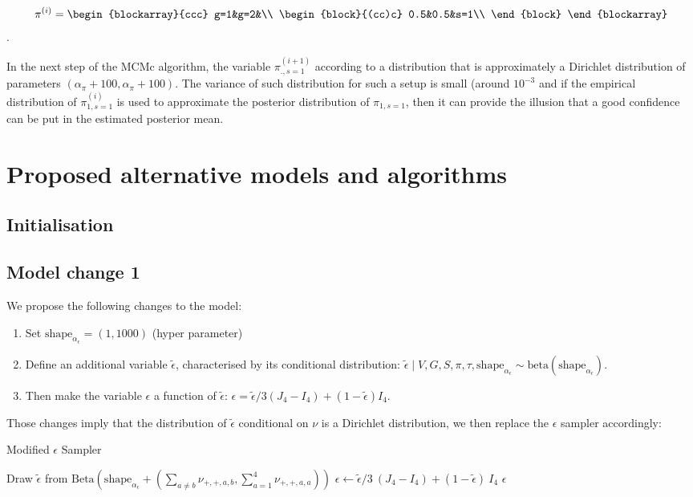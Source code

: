 \documentclass{article}
\begin{document}
$$\pi^{(i)}=\begin{blockarray}{ccc}
    g=1&g=2&\\
    \begin{block}{(cc)c}
    0.5&0.5&s=1\\
    \end{block}
\end{blockarray}$$.
    
In the next step of the MCMc algorithm, the variable $\pi^{(i+1)}_{.,s=1}$ according to a distribution that is approximately a Dirichlet distribution of parameters $(\alpha_\pi+100,\alpha_\pi+100)$. 
The variance of such distribution for such a setup is small (around $10^{-3}$ and if the empirical distribution of $\pi^{(i)}_{1,s=1}$ is used to approximate the posterior distribution of $\pi_{1,s=1}$, then it can provide the illusion that a good confidence can be put in the estimated posterior mean.


\section{Proposed alternative models and algorithms}

\subsection{Initialisation }

\subsection{Model change 1 }
We propose the following changes to the model:
\begin{enumerate}
    \item Set $\mathrm{shape}_{\alpha_\epsilon}=(1,1000)$ (hyper parameter)
\item Define an additional variable $\tilde\epsilon$, characterised by its conditional distribution: $\tilde\epsilon\mid V,G,S,\pi,\tau,\mathrm{shape}_{\alpha_\epsilon}\sim \mathrm{beta}(\mathrm{shape}_{\alpha_\epsilon})$.
\item Then make the variable $\epsilon$  a function of $\tilde\epsilon$: $\epsilon=\tilde\epsilon/3 (J_4-I_4)+(1-\tilde\epsilon) I_4$.
\end{enumerate}
Those changes imply that the distribution of $\tilde\epsilon$ conditional on $\nu$ is a Dirichlet distribution, we then replace the $\epsilon$ sampler accordingly:


\begin{algorithm}[H]
\caption{Modified $\epsilon$ Sampler }\label{alg:desman_tau}
\begin{algorithmic}
        \State Draw $\tilde\epsilon$
        from $\mathrm{Beta}\left(\mathrm{shape}_{\alpha_\epsilon}+
        \left(\sum_{a\neq b}\nu_{+,+,a,b},\sum_{a=1}^4\nu_{+,+,a,a}\right)\right)$
        \State $\epsilon\gets \tilde\epsilon/3~ (J_4-I_4)+(1-\tilde\epsilon)~ I_4$
\State \Return $\epsilon$
\EndProcedure
\end{algorithmic}
\end{algorithm}
\end{document}
